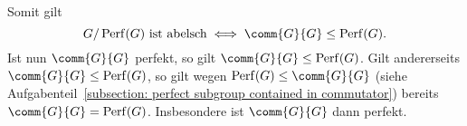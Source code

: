 Somit gilt
\[
        \text{$G/\Perf{G}$ ist abelsch}
  \iff  \comm{G}{G} \subgroup \Perf{G}.
\]
Ist nun $\comm{G}{G}$ perfekt, so gilt  $\comm{G}{G} \subgroup \Perf{G}$.
Gilt andererseits $\comm{G}{G} \subgroup \Perf{G}$, so gilt wegen $\Perf{G} \subgroup \comm{G}{G}$ (siehe Aufgabenteil~\ref{subsection: perfect subgroup contained in commutator}) bereits $\comm{G}{G} = \Perf{G}$.
Insbesondere ist $\comm{G}{G}$ dann perfekt.




